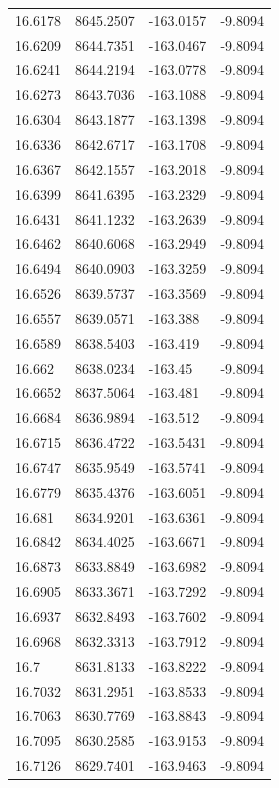 \begin{table}[H]
\begin{tabular}{llll}
16.6178 & 8645.2507 & -163.0157 & -9.8094 \\
16.6209 & 8644.7351 & -163.0467 & -9.8094 \\
16.6241 & 8644.2194 & -163.0778 & -9.8094 \\
16.6273 & 8643.7036 & -163.1088 & -9.8094 \\
16.6304 & 8643.1877 & -163.1398 & -9.8094 \\
16.6336 & 8642.6717 & -163.1708 & -9.8094 \\
16.6367 & 8642.1557 & -163.2018 & -9.8094 \\
16.6399 & 8641.6395 & -163.2329 & -9.8094 \\
16.6431 & 8641.1232 & -163.2639 & -9.8094 \\
16.6462 & 8640.6068 & -163.2949 & -9.8094 \\
16.6494 & 8640.0903 & -163.3259 & -9.8094 \\
16.6526 & 8639.5737 & -163.3569 & -9.8094 \\
16.6557 & 8639.0571 & -163.388 & -9.8094 \\
16.6589 & 8638.5403 & -163.419 & -9.8094 \\
16.662 & 8638.0234 & -163.45 & -9.8094 \\
16.6652 & 8637.5064 & -163.481 & -9.8094 \\
16.6684 & 8636.9894 & -163.512 & -9.8094 \\
16.6715 & 8636.4722 & -163.5431 & -9.8094 \\
16.6747 & 8635.9549 & -163.5741 & -9.8094 \\
16.6779 & 8635.4376 & -163.6051 & -9.8094 \\
16.681 & 8634.9201 & -163.6361 & -9.8094 \\
16.6842 & 8634.4025 & -163.6671 & -9.8094 \\
16.6873 & 8633.8849 & -163.6982 & -9.8094 \\
16.6905 & 8633.3671 & -163.7292 & -9.8094 \\
16.6937 & 8632.8493 & -163.7602 & -9.8094 \\
16.6968 & 8632.3313 & -163.7912 & -9.8094 \\
16.7 & 8631.8133 & -163.8222 & -9.8094 \\
16.7032 & 8631.2951 & -163.8533 & -9.8094 \\
16.7063 & 8630.7769 & -163.8843 & -9.8094 \\
16.7095 & 8630.2585 & -163.9153 & -9.8094 \\
16.7126 & 8629.7401 & -163.9463 & -9.8094 \\

\end{tabular}
\end{table}
